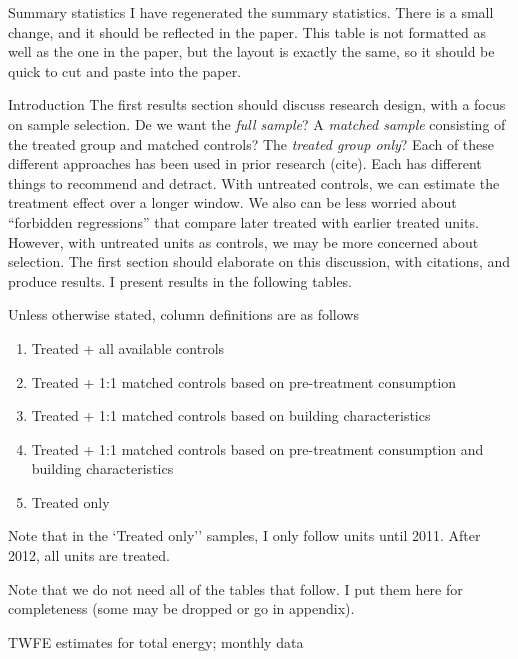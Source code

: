 \documentclass[8pt]{beamer}
\begin{document}
\begin{frame}{Summary statistics}
	I have regenerated the summary statistics.  There is a small change, and it should be reflected in the paper. This table is not formatted as well as the one in the paper, but the layout is exactly the same, so it should be quick to cut and paste into the paper.
	
	
\end{frame}

\begin{frame}{Introduction}
	The first results section should discuss research design, with a focus on sample selection. De we want the \textit{full sample}? A \textit{matched sample} consisting of the treated group and matched controls? The \textit{treated group only}? Each of these different approaches has been used in prior research (cite).  Each has different things to recommend and detract. With untreated controls, we can estimate the treatment effect over a longer window. We also can be less worried about ``forbidden regressions'' that compare later treated with earlier treated units. However, with untreated units as controls, we may be more concerned about selection.  The first section should elaborate on this discussion, with citations, and produce results.    I present results in the following tables.
	
	Unless otherwise stated, column definitions are as follows
	\begin{enumerate}
		\item Treated + all available controls
		\item Treated + 1:1 matched controls based on pre-treatment consumption
		\item Treated + 1:1 matched controls based on building characteristics
		\item Treated + 1:1 matched controls based on pre-treatment consumption and building characteristics
		\item Treated only
	\end{enumerate}

	Note that in the `Treated only'' samples, I only follow units until 2011. After 2012, all units are treated.
	
	Note that we do not need all of the tables that follow. I put them here for completeness (some may be dropped or go in appendix).
\end{frame}

\begin{frame}{TWFE estimates for total energy; monthly data}
	
\end{frame}
\end{document}
